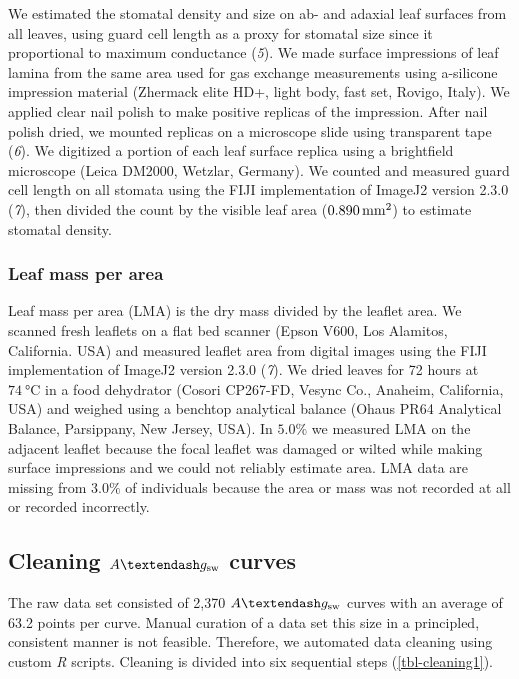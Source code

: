 \documentclass[
  letterpaper,
  DIV=11,
  numbers=noendperiod]{scrartcl}
\newcommand{\agcurve}{$A \textendash g_\text{sw}$}
\begin{document}
We estimated the stomatal density and size on ab- and adaxial leaf
surfaces from all leaves, using guard cell length as a proxy for
stomatal size since it proportional to maximum conductance (\emph{5}).
We made surface impressions of leaf lamina from the same area used for
gas exchange measurements using a-silicone impression material (Zhermack
elite HD+, light body, fast set, Rovigo, Italy). We applied clear nail
polish to make positive replicas of the impression. After nail polish
dried, we mounted replicas on a microscope slide using transparent tape
(\emph{6}). We digitized a portion of each leaf surface replica using a
brightfield microscope (Leica DM2000, Wetzlar, Germany). We counted and
measured guard cell length on all stomata using the FIJI implementation
of ImageJ2 version 2.3.0 (\emph{7}), then divided the count by the
visible leaf area (\(\qty{0.890}{\raiseto{2}\milli\meter}\)) to estimate
stomatal density.

\subsubsection{Leaf mass per area}\label{leaf-mass-per-area}

Leaf mass per area (LMA) is the dry mass divided by the leaflet area. We
scanned fresh leaflets on a flat bed scanner (Epson V600, Los Alamitos,
California. USA) and measured leaflet area from digital images using the
FIJI implementation of ImageJ2 version 2.3.0 (\emph{7}). We dried leaves
for 72 hours at \(\qty{74}{\degreeCelsius}\) in a food dehydrator
(Cosori CP267-FD, Vesync Co., Anaheim, California, USA) and weighed
using a benchtop analytical balance (Ohaus PR64 Analytical Balance,
Parsippany, New Jersey, USA). In \(5.0\%\) we measured LMA on the
adjacent leaflet because the focal leaflet was damaged or wilted while
making surface impressions and we could not reliably estimate area. LMA
data are missing from \(3.0\%\) of individuals because the area or mass
was not recorded at all or recorded incorrectly.

\subsection{\texorpdfstring{Cleaning \agcurve{}
curves}{Cleaning  curves}}\label{cleaning-curves}

The raw data set consisted of 2,370 \agcurve{} curves with an average of
63.2 points per curve. Manual curation of a data set this size in a
principled, consistent manner is not feasible. Therefore, we automated
data cleaning using custom \emph{R} scripts. Cleaning is divided into
six sequential steps (\autoref{tbl-cleaning1}).
\end{document}

